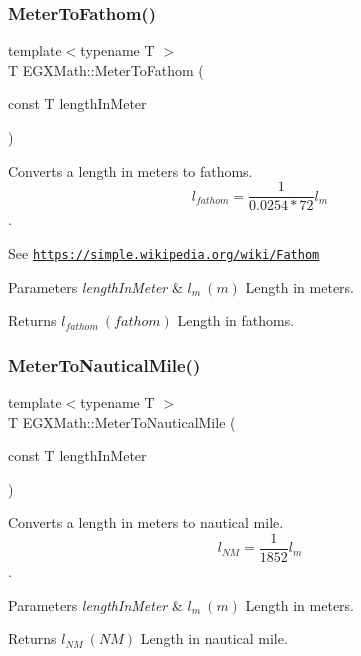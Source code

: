 \subsubsection{\texorpdfstring{Meter\+To\+Fathom()}{MeterToFathom()}}
{\footnotesize\ttfamily template$<$typename T $>$ \\
T E\+G\+X\+Math\+::\+Meter\+To\+Fathom (\begin{DoxyParamCaption}\item[{const T}]{length\+In\+Meter }\end{DoxyParamCaption})}



Converts a length in meters to fathoms. \[ l_{fathom}= \frac{1}{0.0254 * 72} l_{m} \]. 

See \href{https://simple.wikipedia.org/wiki/Fathom}{\tt https\+://simple.\+wikipedia.\+org/wiki/\+Fathom} 
\begin{DoxyParams}{Parameters}
{\em length\+In\+Meter} & $ l_{m}\ (m)$ Length in meters. \\
\hline
\end{DoxyParams}
\begin{DoxyReturn}{Returns}
$ l_{fathom}\ (fathom)$ Length in fathoms. 
\end{DoxyReturn}
\mbox{\label{group___e_g_x_math-_conversions-_length_conversions-_s_i-_meter-_nautical_ga501f0dd53cb3c21d377eac2a18fabdf8}} 
\subsubsection{\texorpdfstring{Meter\+To\+Nautical\+Mile()}{MeterToNauticalMile()}}
{\footnotesize\ttfamily template$<$typename T $>$ \\
T E\+G\+X\+Math\+::\+Meter\+To\+Nautical\+Mile (\begin{DoxyParamCaption}\item[{const T}]{length\+In\+Meter }\end{DoxyParamCaption})}



Converts a length in meters to nautical mile. \[ l_{NM}= \frac{1}{1852} l_{m} \]. 


\begin{DoxyParams}{Parameters}
{\em length\+In\+Meter} & $ l_{m}\ (m)$ Length in meters. \\
\hline
\end{DoxyParams}
\begin{DoxyReturn}{Returns}
$ l_{NM}\ (NM)$ Length in nautical mile. 
\end{DoxyReturn}
